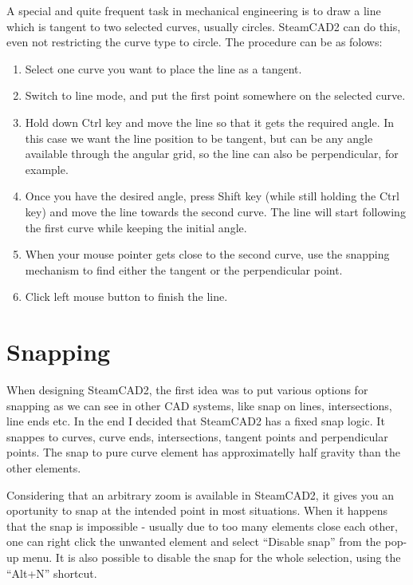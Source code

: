 A special and quite frequent task in mechanical engineering is to draw a line which is tangent
to two selected curves, usually circles. SteamCAD2 can do this, even not restricting the curve
type to circle. The procedure can be as folows:
\begin{enumerate}
\item Select one curve you want to place the line as a tangent.
\item Switch to line mode, and put the first point somewhere on the selected curve.
\item Hold down Ctrl key and move the line so that it gets the required angle. In this case
we want the line position to be tangent, but can be any angle available through the angular
grid, so the line can also be perpendicular, for example.
\item Once you have the desired angle, press Shift key (while still holding the Ctrl key)
and move the line towards the second curve. The line will start following the first curve
while keeping the initial angle.
\item When your mouse pointer gets close to the second curve, use the snapping mechanism
to find either the tangent or the perpendicular point.
\item Click left mouse button to finish the line.
\end{enumerate}

\section{Snapping}

When designing SteamCAD2, the first idea was to put various options for snapping as we can
see in other CAD systems, like snap on lines, intersections, line ends etc. In the end
I decided that SteamCAD2 has a fixed snap logic. It snappes to curves, curve ends,
intersections, tangent points and perpendicular points. The snap to pure curve element has
approximatelly half gravity than the other elements.

Considering that an arbitrary zoom is available in SteamCAD2, it gives you an oportunity
to snap at the intended point in most situations. When it happens that the snap is
impossible - usually due to too many elements close each other, one can right click the
unwanted element and select ``Disable snap'' from the pop-up menu. It is also possible to
disable the snap for the whole selection, using the ``Alt+N'' shortcut.

